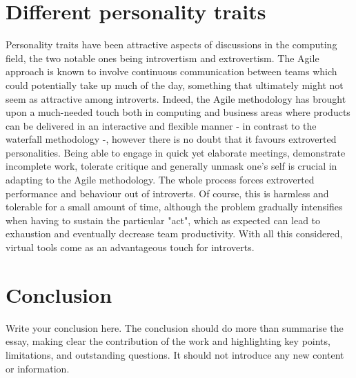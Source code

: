 \documentclass{scrartcl}
\begin{document}
\section{Different personality traits}
Personality traits have been attractive aspects of discussions in the computing field, the two notable ones being introvertism and extrovertism. The Agile approach is known to involve continuous communication between teams which could potentially take up much of the day, something that ultimately might not seem as attractive among introverts. Indeed, the Agile methodology has brought upon a much-needed touch both in computing and business areas where products can be delivered in an interactive and flexible manner - in contrast to the waterfall methodology -, however there is no doubt that it favours extroverted personalities. Being able to engage in quick yet elaborate meetings, demonstrate incomplete work, tolerate critique and generally unmask one's self is crucial in adapting to the Agile methodology. The whole process forces extroverted performance and behaviour out of introverts. Of course, this is harmless and tolerable for a small amount of time, although the problem gradually intensifies when having to sustain the particular "act", which as expected can lead to exhaustion and eventually decrease team productivity. With all this considered, virtual tools come as an advantageous touch for introverts. 

\section{Conclusion}

Write your conclusion here. The conclusion should do more than summarise the essay, making clear the contribution of the work and highlighting key points, limitations, and outstanding questions. It should not introduce any new content or information.



\end{document}
